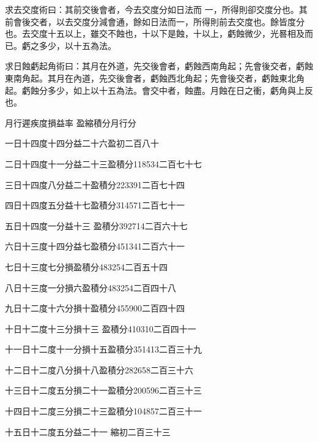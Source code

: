 \begin{pinyinscope}
 求去交度術曰：其前交後會者，今去交度分如日法而
 一，所得則卻交度分也。其前會後交者，以去交度分減會通，餘如日法而一，所得則前去交度也。餘皆度分也。去交度十五以上，雖交不蝕也，十以下是蝕，十以上，虧蝕微少，光晷相及而已。虧之多少，以十五為法。



 求日蝕虧起角術曰：其月在外道，先交後會者，虧蝕西南角起；先會後交者，虧蝕東南角起。其月在內道，先交後會者，虧蝕西北角起；先會後交者，虧蝕東北角起。虧蝕分多少，如上以十五為法。會交中者，蝕盡。月蝕在日之衝，虧角與上反也。



 月行遲疾度損益率
 盈縮積分月行分



 一日十四度十四分益二十六盈初二百八十



 二日十四度十一分益二十三盈積分118534二百七十七



 三日十四度八分益二十盈積分223391二百七十四



 四日十四度五分益十七盈積分314571二百七十一



 五日十四度一分益十三
 盈積分392714二百六十七



 六日十三度十四分益七盈積分451341二百六十一



 七日十三度七分損盈積分483254二百五十四



 八日十三度一分損六盈積分483254二百四十八



 九日十二度十六分損十盈積分455900二百四十四



 十日十二度十三分損十三
 盈積分410310二百四十一



 十一日十二度十一分損十五盈積分351413二百三十九



 十二日十二度八分損十八盈積分282658二百三十六



 十三日十二度五分損二十一盈積分200596二百三十三



 十四日十二度三分損二十三盈積分104857二百三十一



 十五日十二度五分益二十一
 縮初二百三十三




\end{pinyinscope}
